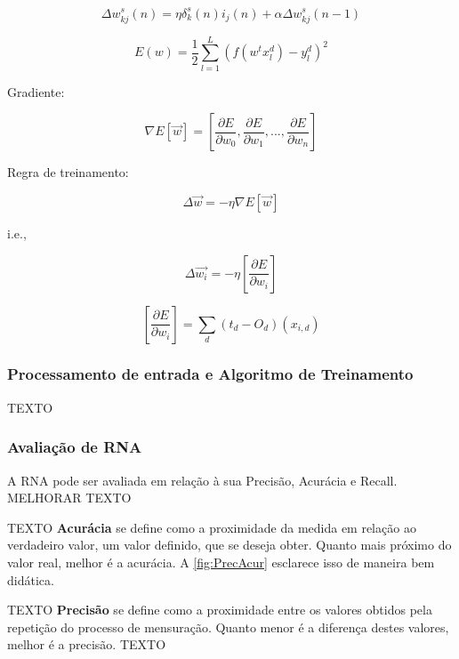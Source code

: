 \begin{equation}
    \Delta w_{kj}^{s}(n) = \eta \delta_{k}^{s}(n) i_{j}(n) + \alpha \Delta w_{kj}^{s} (n-1)
\end{equation}

\begin{equation}
    E(w) = \frac{1}{2}\sum_{l=1}^{L}(f(w^{t}x_{l}^{d})-y_{l}^{d})^{2}
\end{equation}

Gradiente:

\begin{equation}
    \nabla E[\vec{w}] = \left [ \frac{\partial E}{\partial w_{0}}, \frac{\partial E}{\partial w_{1}}, ..., \frac{\partial E}{\partial w_{n}} \right ]
\end{equation}

Regra de treinamento:

\begin{equation}
    \Delta \vec{w} = -\eta \nabla E [\vec{w}]
\end{equation}

i.e.,

\begin{equation}
    \Delta \vec{w_{i}} = -\eta \left [ \frac{\partial E}{\partial w_{i}} \right ]
\end{equation}

\begin{equation}
    \left [ \frac{\partial E}{\partial w_{i}} \right ] = \sum_d (t_{d} - O_{d})(x_{i,d})
\end{equation}

\subsubsection{Processamento de entrada e Algoritmo de Treinamento}
{\color{red}TEXTO}

\subsubsection{Avaliação de RNA}
A RNA pode ser avaliada em relação à sua Precisão, Acurácia e Recall.
{\color{red}MELHORAR TEXTO}

{\color{red}TEXTO}
\textbf{Acurácia} se define como a proximidade da medida em relação ao verdadeiro valor, um valor definido, que se deseja obter. Quanto mais próximo do valor real, melhor é a acurácia. A \autoref{fig:PrecAcur} esclarece isso de maneira bem didática.

{\color{red}TEXTO}
\textbf{Precisão} se define como a proximidade entre os valores obtidos pela repetição do processo de mensuração. Quanto menor é a diferença destes valores, melhor é a precisão. 
{\color{red}TEXTO}

